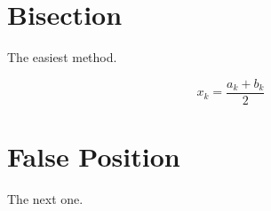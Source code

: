 \documentclass[thesis]{./tex/thesis-umich}
\begin{document}
\section{Bisection}
The easiest method.

\begin{equation}
x_k = \frac{a_k+b_k}{2}
\end{equation}

\section{False Position}
The next one.



\end{document}
